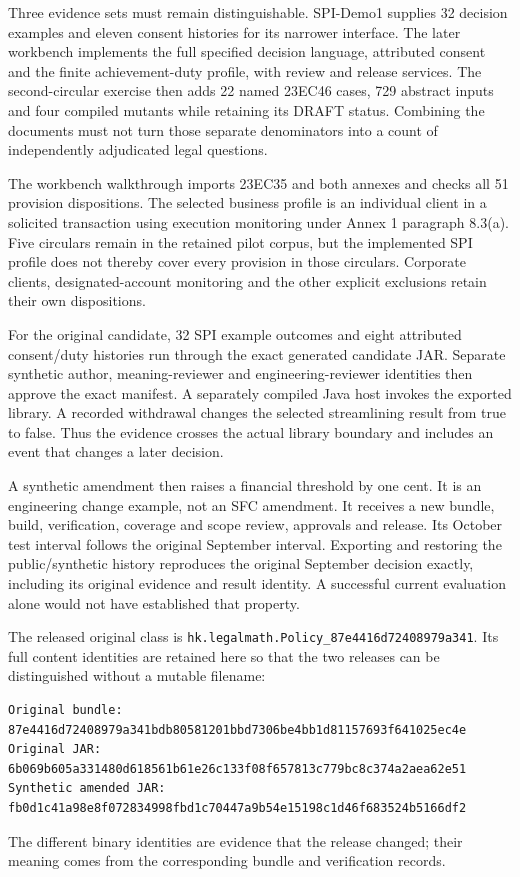 \documentclass[12pt,a4paper,oneside,openany]{book}
\begin{document}
Three evidence sets must remain distinguishable. SPI-Demo1 supplies 32 decision
examples and eleven consent histories for its narrower interface. The later
workbench implements the full specified decision language, attributed consent
and the finite achievement-duty profile, with review and release services.
The second-circular exercise then adds 22 named 23EC46 cases, 729 abstract
inputs and four compiled mutants while retaining its DRAFT status. Combining
the documents must not turn those separate denominators into a count of
independently adjudicated legal questions.

The workbench walkthrough imports 23EC35 and both annexes and checks all
51 provision dispositions. The selected business profile is an individual
client in a solicited transaction using execution monitoring under Annex 1
paragraph 8.3(a). Five circulars remain in the retained pilot corpus, but the
implemented SPI profile does not thereby cover every provision in those
circulars. Corporate clients, designated-account monitoring and the other
explicit exclusions retain their own dispositions.

For the original candidate, 32 SPI example outcomes and eight attributed
consent/duty histories run through the exact generated candidate JAR.
Separate synthetic author, meaning-reviewer and engineering-reviewer identities
then approve the exact manifest. A separately compiled Java host invokes the
exported library. A recorded withdrawal changes the selected streamlining
result from true to false. Thus the evidence crosses the actual library
boundary and includes an event that changes a later decision.

A synthetic amendment then raises a financial threshold by one cent. It is an
engineering change example, not an SFC amendment. It receives a new bundle,
build, verification, coverage and scope review, approvals and release. Its
October test interval follows the original September interval. Exporting and
restoring the public/synthetic history reproduces the original September
decision exactly, including its original evidence and result identity. A
successful current evaluation alone would not have established that property.

The released original class is
\texttt{hk.legalmath.Policy\_87e4416d72408979a341}. Its full content identities
are retained here so that the two releases can be distinguished without a
mutable filename:
\begin{lstlisting}[caption={SHA-256 identities of the retained local walkthrough.}]
Original bundle:
87e4416d72408979a341bdb80581201bbd7306be4bb1d81157693f641025ec4e
Original JAR:
6b069b605a331480d618561b61e26c133f08f657813c779bc8c374a2aea62e51
Synthetic amended JAR:
fb0d1c41a98e8f072834998fbd1c70447a9b54e15198c1d46f683524b5166df2
\end{lstlisting}
The different binary identities are evidence that the release changed; their
meaning comes from the corresponding bundle and verification records.
\end{document}

